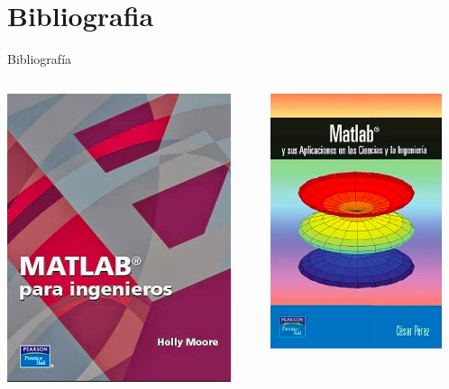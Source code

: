 \documentclass{bredelebeamer}
\begin{document}



\section{Bibliografia}

\begin{frame}{Bibliografía}
\begin{columns}
\begin{column}{0.5\textwidth}
\begin{center}
\includegraphics[scale=0.4]{images/biblio1.png}
\end{center}
\end{column}
\begin{column}{0.5\textwidth}
\begin{center}
\includegraphics[scale=0.5]{images/biblio2.png}
\end{center}
\end{column}
\end{columns}
\end{frame}
\end{document}
